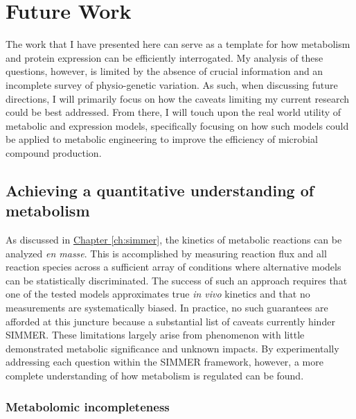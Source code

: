 \section{Future Work}

The work that I have presented here can serve as a template for how metabolism and protein expression can be efficiently interrogated. My analysis of these questions, however, is limited by the absence of crucial information and an incomplete survey of physio-genetic variation. As such, when discussing future directions, I will primarily focus on how the caveats limiting my current research could be best addressed. From there, I will touch upon the real world utility of metabolic and expression models, specifically focusing on how such models could be applied to metabolic engineering to improve the efficiency of microbial compound production.

\subsection{Achieving a quantitative understanding of metabolism}

As discussed in \hyperref[ch:simmer]{Chapter \ref{ch:simmer}}, the kinetics of metabolic reactions can be analyzed \textit{en masse}. This is accomplished by measuring reaction flux and all reaction species across a sufficient array of conditions where alternative models can be statistically discriminated. The success of such an approach requires that one of the tested models approximates true \textit{in vivo} kinetics and that no measurements are systematically biased. In practice, no such guarantees are afforded at this juncture because a substantial list of caveats currently hinder SIMMER. These limitations largely arise from phenomenon with little demonstrated metabolic significance and unknown impacts. By experimentally addressing each question within the SIMMER framework, however, a more complete understanding of how metabolism is regulated can be found.

\subsubsection{Metabolomic incompleteness}

